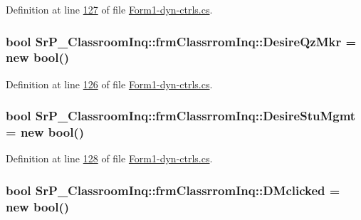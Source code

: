 \-Definition at line \hyperlink{_form1-dyn-ctrls_8cs_source_l00127}{127} of file \hyperlink{_form1-dyn-ctrls_8cs_source}{\-Form1-\/dyn-\/ctrls.\-cs}.

\hypertarget{class_sr_p___classroom_inq_1_1frm_classrrom_inq_a6be0280a203b7fa9cfda5d8d1703d81a}{
\subsubsection[{\-Desire\-Qz\-Mkr}]{\setlength{\rightskip}{0pt plus 5cm}bool {\bf \-Sr\-P\-\_\-\-Classroom\-Inq\-::frm\-Classrrom\-Inq\-::\-Desire\-Qz\-Mkr} = new bool()}}
\label{class_sr_p___classroom_inq_1_1frm_classrrom_inq_a6be0280a203b7fa9cfda5d8d1703d81a}


\-Definition at line \hyperlink{_form1-dyn-ctrls_8cs_source_l00126}{126} of file \hyperlink{_form1-dyn-ctrls_8cs_source}{\-Form1-\/dyn-\/ctrls.\-cs}.

\hypertarget{class_sr_p___classroom_inq_1_1frm_classrrom_inq_acc0266ba1df8a99c08f9f4ad95c01252}{
\subsubsection[{\-Desire\-Stu\-Mgmt}]{\setlength{\rightskip}{0pt plus 5cm}bool {\bf \-Sr\-P\-\_\-\-Classroom\-Inq\-::frm\-Classrrom\-Inq\-::\-Desire\-Stu\-Mgmt} = new bool()}}
\label{class_sr_p___classroom_inq_1_1frm_classrrom_inq_acc0266ba1df8a99c08f9f4ad95c01252}


\-Definition at line \hyperlink{_form1-dyn-ctrls_8cs_source_l00128}{128} of file \hyperlink{_form1-dyn-ctrls_8cs_source}{\-Form1-\/dyn-\/ctrls.\-cs}.

\hypertarget{class_sr_p___classroom_inq_1_1frm_classrrom_inq_a663c3385393ae39a41bd647632ba4617}{
\subsubsection[{\-D\-Mclicked}]{\setlength{\rightskip}{0pt plus 5cm}bool {\bf \-Sr\-P\-\_\-\-Classroom\-Inq\-::frm\-Classrrom\-Inq\-::\-D\-Mclicked} = new bool()}}
\label{class_sr_p___classroom_inq_1_1frm_classrrom_inq_a663c3385393ae39a41bd647632ba4617}


